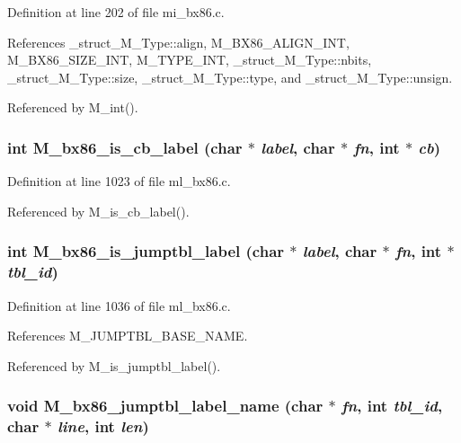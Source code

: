 Definition at line 202 of file mi\_\-bx86.c.

References \_\-struct\_\-M\_\-Type::align, M\_\-BX86\_\-ALIGN\_\-INT, M\_\-BX86\_\-SIZE\_\-INT, M\_\-TYPE\_\-INT, \_\-struct\_\-M\_\-Type::nbits, \_\-struct\_\-M\_\-Type::size, \_\-struct\_\-M\_\-Type::type, and \_\-struct\_\-M\_\-Type::unsign.

Referenced by M\_\-int().
\subsubsection{\setlength{\rightskip}{0pt plus 5cm}int M\_\-bx86\_\-is\_\-cb\_\-label (char $\ast$ {\em label}, char $\ast$ {\em fn}, int $\ast$ {\em cb})}\label{m__bx86_8h_f73c81af020b2cc019475a9d715b448b}




Definition at line 1023 of file ml\_\-bx86.c.

Referenced by M\_\-is\_\-cb\_\-label().
\subsubsection{\setlength{\rightskip}{0pt plus 5cm}int M\_\-bx86\_\-is\_\-jumptbl\_\-label (char $\ast$ {\em label}, char $\ast$ {\em fn}, int $\ast$ {\em tbl\_\-id})}\label{m__bx86_8h_d889ce4fb3f4591f9eaff89ca14dd2d6}




Definition at line 1036 of file ml\_\-bx86.c.

References M\_\-JUMPTBL\_\-BASE\_\-NAME.

Referenced by M\_\-is\_\-jumptbl\_\-label().
\subsubsection{\setlength{\rightskip}{0pt plus 5cm}void M\_\-bx86\_\-jumptbl\_\-label\_\-name (char $\ast$ {\em fn}, int {\em tbl\_\-id}, char $\ast$ {\em line}, int {\em len})}\label{m__bx86_8h_6e48d8df24c32bf54a6784df59c8a72b}




